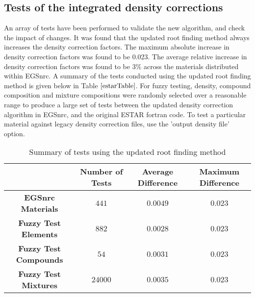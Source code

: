 \subsection{Tests of the integrated density corrections}
An array of tests have been performed to validate the new algorithm, and check the impact of changes. It was found that the updated root finding method always increases the density correction factors. The maximum absolute increase in density correction factors was found to be 0.023. The average relative increase in density correction factors was found to be $3\%$ across the materials distributed within EGSnrc. A summary of the tests conducted using the updated root finding method is given below in Table $\ref{estarTable}$. For fuzzy testing, density, compound composition and mixture compositions were randomly selected over a reasonable range to produce a large set of tests between the updated density correction algorithm in EGSnrc, and the original ESTAR fortran code. To test a particular material against legacy density correction files, use the 'output density file' option.
\begin{table}[phtb]
\begin{center}
\begin{tabular}{|c | c c c |}
 \hline
 $ $ & \textbf{Number of Tests} & \textbf{Average Difference} & \textbf{Maximum Difference}\\ [0.5ex]
 \hline\hline
 \textbf{EGSnrc Materials} & $441$ & $0.0049$ & $0.023$\\
 \hline
 \textbf{Fuzzy Test Elements} & $882$ & $0.0028$ & $0.023$ \\
 \hline
 \textbf{Fuzzy Test Compounds} & $54$ & $0.0031$ & $0.023$ \\
  \hline
 \textbf{Fuzzy Test Mixtures} & $24000$ & $0.0035$ & $0.023$ \\[1ex]
 \hline
\end{tabular}
\caption{\label{estarTable}Summary of tests using the updated root finding method}
\end{center}
\end{table}



